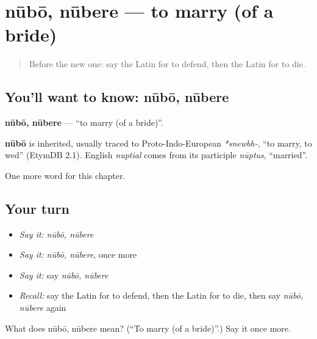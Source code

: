 \section[nūbō, nūbere]{nūbō, nūbere — to marry (of a bride)}

\label{lesson:LA-C198-nubo}



\begin{quote}
Before the new one: say the Latin for to defend, then the Latin for to die.
\end{quote}

\subsection*{You'll want to know: nūbō, nūbere}
\textbf{nūbō, nūbere} — \textquotedblleft{}to marry (of a bride)\textquotedblright{}.

\begin{cousinweb}
\textbf{nūbō} is inherited, usually traced to Proto-Indo-European \emph{*snewbh-}, \textquotedblleft{}to marry, to wed\textquotedblright{} (EtymDB 2.1). English \emph{nuptial} comes from its participle \emph{nūptus}, \textquotedblleft{}married\textquotedblright{}.
\end{cousinweb}

\begin{grammarlens}[title={What you've built}]
One more word for this chapter.
\end{grammarlens}

\subsection*{Your turn}
\begin{itemize}
\raggedright
  \item \emph{Say it:} \emph{nūbō, nūbere}
  \item \emph{Say it:} \emph{nūbō, nūbere}, once more
  \item \emph{Say it:} say \emph{nūbō, nūbere}
  \item \emph{Recall:} say the Latin for to defend, then the Latin for to die, then say \emph{nūbō, nūbere} again
\end{itemize}

\begin{tcolorbox}[breakable,colback=teal!4,colframe=teal!35!black,title={Before you move on}]
What does nūbō, nūbere mean? (\textquotedblleft{}To marry (of a bride)\textquotedblright{}.) Say it once more.
\end{tcolorbox}
